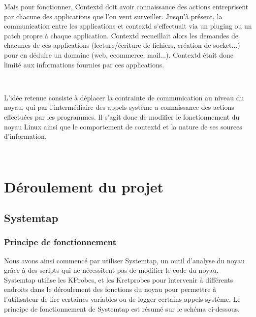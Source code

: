\documentclass[pdftex,a4paper,titlepage,11pt]{article}
\begin{document}
Mais pour fonctionner, Contextd doit avoir connaissance des actions entreprisent par chacune des applications que l'on veut surveiller. Jusqu'à présent, la communication entre les applications et contextd s'effectuait via un pluging ou un patch propre à chaque application. Contextd recueillait alors les demandes de chacunes de ces applications (lecture/écriture de fichiers, création de socket...) pour en déduire un domaine (web, ecommerce, mail...). Contextd était donc limité aux informations fournies par ces applications.

~

L'idée retenue consiste à déplacer la contrainte de communication au niveau du noyau, qui par l'intermédiaire des appels système a connaissance des actions effectuées par les programmes. Il s'agit donc de modifier le fonctionnement du noyau Linux ainsi que le comportement de contextd et la nature de ses sources d'information.

~

\newpage



\newpage

\section{Déroulement du projet}

\subsection{Systemtap}

\subsubsection{Principe de fonctionnement}

Nous avons ainsi commencé par utiliser Systemtap, un outil d'analyse du noyau grâce à des scripts qui ne nécessitent pas de modifier le code du noyau. Systemtap utilise les KProbes, et les Kretprobes\cite{IBMRBST} pour intervenir à différents endroits dans le déroulement des fonctions du noyau pour permettre à l'utilisateur de lire certaines variables ou de logger certains appels système. Le principe de fonctionnement de Systemtap est résumé sur le schéma ci-dessous.
\end{document}

